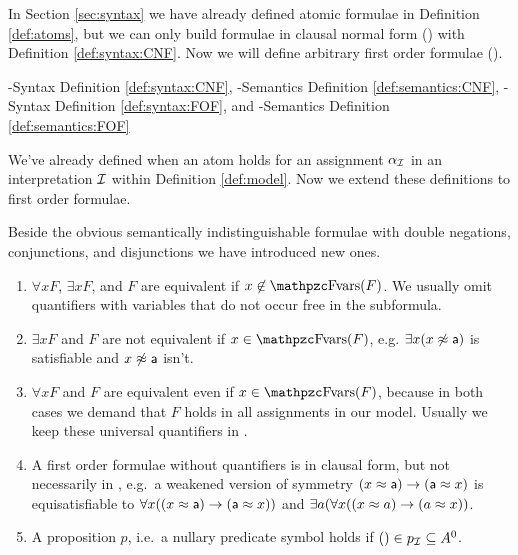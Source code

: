 

In Section \ref{sec:syntax} we have already defined atomic formulae in Definition \ref{def:atoms}, 
but we can only build formulae in clausal normal form (\CNF) with Definition \vref{def:syntax:CNF}.
Now we will define arbitrary first order formulae (\FOF).

\CNF-Syntax Definition \vref{def:syntax:CNF},
\CNF-Semantics Definition \vref{def:semantics:CNF},
\FOF-Syntax Definition \vref{def:syntax:FOF}, and
\FOF-Semantics Definition \vref{def:semantics:FOF}



We've already defined when an atom holds for an assignment $\alpha_{\mathcal I}$ 
in an interpretation ${\mathcal I}$ within Definition \vref{def:model}.
Now we extend these definitions to first order formulae.


%
	Beside the obvious semantically indistinguishable formulae with double negations, conjunctions, and disjunctions 
	we have introduced new ones.
	\begin{enumerate}
		\item $\forall x F$, $\exists x F$, and $F$ are equivalent if $x\not\in\fvar(F)$. 
		We usually omit quantifiers with variables that do not occur free in the subformula.
		\item $\exists x F$ and $F$ are not equivalent if $x\in\fvar(F)$, 
		e.g. $\exists x(x\not\approx{\mathsf a})$ is satisfiable and $x\not\approx{\mathsf a}$ isn't.
		\item $\forall x F$ and $F$ are equivalent even if $x\in\fvar(F)$, 
		because in both cases we demand that $F$ holds in all assignments in our model.
		Usually we keep these universal quantifiers in \FOF.
		
		\item A first order formulae without quantifiers is in {\myem clausal form}, 
		but not necessarily in \CNF, e.g.~a weakened version of symmetry $(x\approx {\mathsf a})\rightarrow ({\mathsf a}\approx x)$ 
		is equisatisfiable to $\forall x ((x\approx {\mathsf a})\rightarrow ({\mathsf a}\approx x))$ 
		and $\exists a (\forall x ((x\approx a)\rightarrow (a\approx x))$. 
		\item A proposition $p$, i.e.~a nullary predicate symbol holds if $()\in p_{\mathcal I} \subseteq A^0$.
	\end{enumerate}